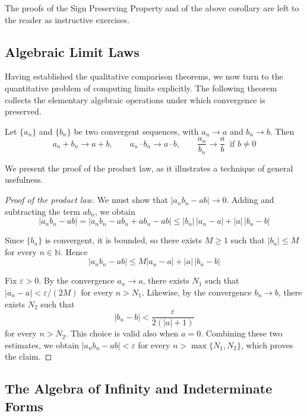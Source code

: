 The proofs of the Sign Preserving Property and of the above corollary are left to the reader as instructive
exercises.

\subsection{Algebraic Limit Laws}

Having established the qualitative comparison theorems, we now turn to the quantitative problem of computing
limits explicitly. The following theorem collects the elementary algebraic operations under which convergence
is preserved.

\begin{theorem}
Let $\{a_n\}$ and $\{b_n\}$ be two convergent sequences, with $a_n \to a$ and $b_n \to b$. Then
\[
a_n + b_n \to a + b, \qquad a_n \cdot b_n \to a \cdot b, \qquad \frac{a_n}{b_n} \to \frac{a}{b} \ \text{ if } b \neq 0
\]

\end{theorem}

We present the proof of the product law, as it illustrates a technique of general usefulness.

\begin{proof}[Proof of the product law]
We must show that $|a_n b_n - ab| \to 0$. Adding and subtracting the term $a b_n$, we obtain
\[
|a_n b_n - ab| = |a_n b_n - a b_n + a b_n - ab| \leq |b_n| \, |a_n - a| + |a| \, |b_n - b|
\]

Since $\{b_n\}$ is convergent, it is bounded, so there exists $M \geq 1$ such that $|b_n| \leq M$ for every
$n \in \mathbb{N}$. Hence
\[
|a_n b_n - ab| \leq M |a_n - a| + |a| \, |b_n - b|
\]

Fix $\varepsilon > 0$. By the convergence $a_n \to a$, there exists $N_1$ such that
$|a_n - a| < \varepsilon / (2M)$ for every $n > N_1$. Likewise, by the convergence $b_n \to b$, there exists
$N_2$ such that
\[
|b_n-b|<\frac{\varepsilon}{2(|a|+1)}
\]
 for every $n>N_2$. This choice is valid also when $a=0$. Combining these two estimates, we obtain
$|a_n b_n - ab| < \varepsilon$ for every $n > \max\{N_1, N_2\}$, which proves the claim.
\end{proof}

\subsection{The Algebra of Infinity and Indeterminate Forms}

